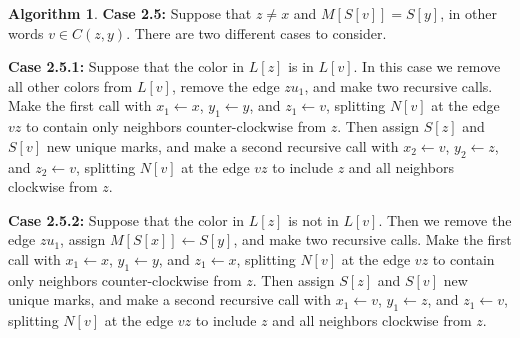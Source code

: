\documentclass[12pt,letterpaper]{article}
\theoremstyle{plain}
\theoremstyle{definition}
\theoremstyle{break}
\newtheorem{algorithm}[lemma]{Algorithm}     %
\begin{document}
\begin{algorithm}
\textbf{Case 2.5:} Suppose that $z\ne x$ and $M[S[v]]=S[y]$, in other words
$v\in C(z,y)$. There are
two different cases to consider.

\textbf{Case 2.5.1:} Suppose that the color in $L[z]$ is in $L[v]$. In this case
we remove all other colors from $L[v]$,
remove the edge $zu_1$, and make two
recursive calls. Make the first call with $x_1\leftarrow x$,
$y_1\leftarrow y$, and $z_1\leftarrow v$, splitting $N[v]$ at the edge
$vz$ to contain only neighbors counter-clockwise from $z$.
Then assign $S[z]$ and $S[v]$ new unique marks, and
make a second
recursive call with $x_2\leftarrow v$, $y_2\leftarrow z$,
and $z_2\leftarrow v$, splitting $N[v]$ at the edge $vz$ to include $z$
and all neighbors clockwise from $z$.

\textbf{Case 2.5.2:} Suppose that the color in $L[z]$ is not in $L[v]$.
Then we remove the edge $zu_1$,
assign $M[S[x]]\leftarrow S[y]$, and make
two recursive calls. Make the first call
with $x_1\leftarrow x$,
$y_1\leftarrow y$, and $z_1\leftarrow x$, splitting $N[v]$ at the edge
$vz$ to contain only neighbors counter-clockwise from $z$.
Then assign $S[z]$ and $S[v]$ new unique marks, and make a
second
recursive call with $x_1\leftarrow v$, $y_1\leftarrow z$,
and $z_1\leftarrow v$, splitting $N[v]$ at the edge $vz$ to include $z$
and all neighbors clockwise from $z$.

\begin{figure}[ht]
\begin{center}
\end{center}
\end{figure}
\end{algorithm}
\end{document}
